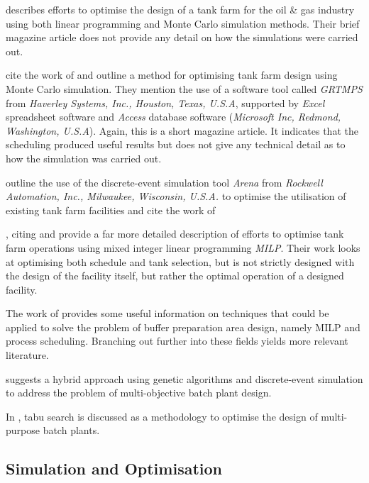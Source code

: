 \citet{Al-Otaibi:2004} describes efforts to optimise the design of a tank farm
for the oil \& gas industry using both linear programming and Monte Carlo
simulation methods.  Their brief magazine article does not provide any detail on
how the simulations were carried out.

\citet{Stewart:2005} cite the work of \citet{Al-Otaibi:2004} and outline a
method for optimising tank farm design using Monte Carlo simulation.  They
mention the use of a software tool called \emph{GRTMPS} from 
\emph{Haverley Systems, Inc., Houston, Texas, U.S.A}, supported by \emph{Excel}
spreadsheet software and \emph{Access} database software
(\emph{Microsoft Inc, Redmond, Washington, U.S.A}).
Again, this is a short magazine article.  It indicates that the scheduling 
produced useful results but does not give any technical detail as to how the
simulation was carried out.

\citet{Sharda:2009} outline the use of the discrete-event simulation tool
\emph{Arena\textsuperscript{\textregistered}} from
\emph{Rockwell Automation, Inc., Milwaukee, Wisconsin, U.S.A.} to optimise the 
utilisation of existing tank farm facilities and cite the work of
\citet{Sharda:2009}

\citet{Terrazas-Moreno:2012}, citing \citet{Stewart:2005} and 
\citet{Sharda:2009} provide a far more detailed description of efforts to
optimise tank farm operations using mixed integer linear programming 
\emph{MILP}.  Their work looks at optimising both schedule and tank selection, 
but is not strictly designed with the design of the facility itself, but rather
the optimal operation of a designed facility.

The work of \citet{Terrazas-Moreno:2012} provides some useful information on
techniques that could be applied to solve the problem of buffer preparation
area design, namely MILP and process scheduling.  Branching out further into
these fields yields more relevant literature.

\citet{Dedieu:2003} suggests a hybrid approach using genetic
algorithms and discrete-event simulation to address the problem of 
multi-objective batch plant design.

In \citet{Cavin:2004, Cavin:2005}, tabu search is discussed as a methodology to
optimise the design of multi-purpose batch plants.

\subsection{Simulation and Optimisation}\label{SS.simopt}

